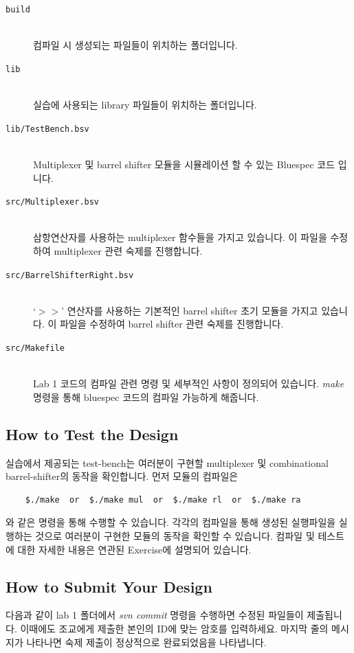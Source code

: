 \documentclass{article}
\begin{document}
\begin{description}
\item [\texttt{build}]\hfill \ \\ 컴파일 시 생성되는 파일들이 위치하는 폴더입니다.

\item [\texttt{lib}]\hfill \ \\ 실습에 사용되는 library 파일들이 위치하는 폴더입니다.

\item [\texttt{lib/TestBench.bsv}]\hfill \ \\ Multiplexer 및 barrel shifter 모듈을 시뮬레이션 할 수 있는 Bluespec 코드
입니다.


\item [\texttt{src/Multiplexer.bsv}]\hfill \ \\ 삼항연산자를 사용하는 multiplexer 함수들을 가지고 있습니다.
이 파일을 수정하여 multiplexer 관련 숙제를 진행합니다.

\item [\texttt{src/BarrelShifterRight.bsv}]\hfill \ \\ `$>>$' 연산자를 사용하는 기본적인 barrel shifter 초기 모듈을
가지고 있습니다. 이 파일을 수정하여 barrel shifter 관련 숙제를 진행합니다.

\item [\texttt{src/Makefile}]\hfill \ \\ Lab 1 코드의 컴파일 관련 명령 및 세부적인 사항이 정의되어 있습니다. \textit{make} 명령을 통해
bluespec 코드의 컴파일 가능하게 해줍니다.

\end{description}

\subsection{How to Test the Design}
실습에서 제공되는 test-bench는 여러분이 구현할 multiplexer 및 combinational barrel-shifter의 동작을 확인합니다.
먼저 모듈의 컴파일은
\begin{verbatim}
    $./make  or  $./make mul  or  $./make rl  or  $./make ra
\end{verbatim}
와 같은 명령을 통해 수행할 수 있습니다.
각각의 컴파일을 통해 생성된 실행파일을 실행하는 것으로 여러분이 구현한 모듈의 동작을 확인할 수 있습니다.
컴파일 및 테스트에 대한 자세한 내용은 연관된 Exercise에 설명되어 있습니다.

\subsection{How to Submit Your Design}
다음과 같이 lab 1 폴더에서 \textit{svn commit} 명령을 수행하면 수정된 파일들이 제출됩니다.
이때에도 조교에게 제출한 본인의 ID에 맞는 암호를 입력하세요.
마지막 줄의 메시지가 나타나면 숙제 제출이 정상적으로 완료되었음을 나타냅니다.
\end{document}
